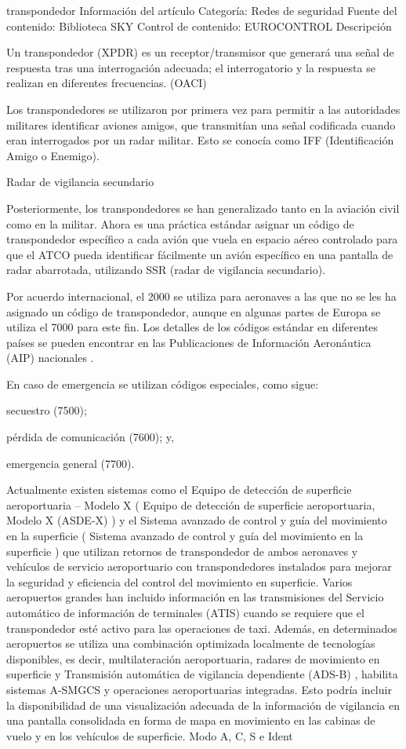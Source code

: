
transpondedor
Información del artículo
Categoría:
Redes de seguridad
Fuente del contenido:
Biblioteca SKY
Control de contenido:
EUROCONTROL
Descripción

Un transpondedor (XPDR) es un receptor/transmisor que generará una señal de respuesta tras una interrogación adecuada; el interrogatorio y la respuesta se realizan en diferentes frecuencias. (OACI)

Los transpondedores se utilizaron por primera vez para permitir a las autoridades militares identificar aviones amigos, que transmitían una señal codificada cuando eran interrogados por un radar militar. Esto se conocía como IFF (Identificación Amigo o Enemigo).

Radar de vigilancia secundario

Posteriormente, los transpondedores se han generalizado tanto en la aviación civil como en la militar. Ahora es una práctica estándar asignar un código de transpondedor específico a cada avión que vuela en espacio aéreo controlado para que el ATCO pueda identificar fácilmente un avión específico en una pantalla de radar abarrotada, utilizando SSR (radar de vigilancia secundario).

Por acuerdo internacional, el 2000 se utiliza para aeronaves a las que no se les ha asignado un código de transpondedor, aunque en algunas partes de Europa se utiliza el 7000 para este fin. Los detalles de los códigos estándar en diferentes países se pueden encontrar en  las Publicaciones de Información Aeronáutica (AIP) nacionales .

En caso de emergencia se utilizan códigos especiales, como sigue:

    secuestro (7500);

    pérdida de comunicación  (7600); y,

    emergencia general (7700).

Actualmente existen sistemas como el Equipo de detección de superficie aeroportuaria – Modelo X ( Equipo de detección de superficie aeroportuaria, Modelo X (ASDE-X) ) y el Sistema avanzado de control y guía del movimiento en la superficie ( Sistema avanzado de control y guía del movimiento en la superficie ) que utilizan retornos de transpondedor de ambos aeronaves y vehículos de servicio aeroportuario con transpondedores instalados para mejorar la seguridad y eficiencia del control del movimiento en superficie. Varios aeropuertos grandes han incluido información en las transmisiones del  Servicio automático de información de terminales (ATIS)  cuando se requiere que el transpondedor esté activo para las operaciones de taxi. Además, en determinados aeropuertos se utiliza una combinación optimizada localmente de tecnologías disponibles, es decir, multilateración aeroportuaria, radares de movimiento en superficie y Transmisión automática de vigilancia dependiente (ADS-B) , habilita sistemas A-SMGCS y operaciones aeroportuarias integradas. Esto podría incluir la disponibilidad de una visualización adecuada de la información de vigilancia en una pantalla consolidada en forma de mapa en movimiento en las cabinas de vuelo y en los vehículos de superficie.
Modo A, C, S e Ident

